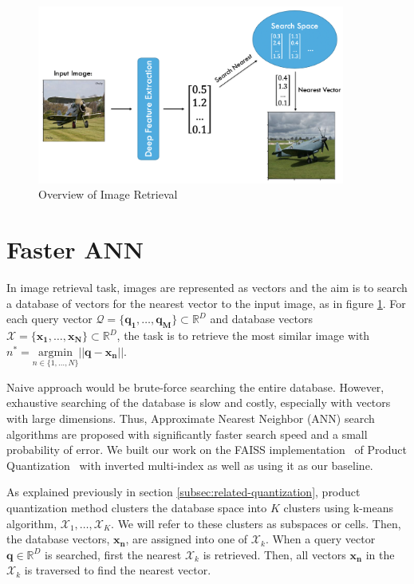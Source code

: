\begin{figure}
    \centering
    \includegraphics[width=0.9\textwidth]{thesis/images/image_ret_exp-fig.png}
    \caption{Overview of Image Retrieval}
    \label{fig:ret-exp}
\end{figure}


\section{Faster ANN}
\label{sec:FasterANN}

In image retrieval task, images are represented as vectors and the aim is to search a database of vectors for the nearest vector to the input image, as in figure \ref{fig:ret-exp}. 
For each query vector $\mathcal{Q} = \{\bm{q_1},\dots,\bm{q_M}\} \subset \mathbb{R}^D$ and database vectors $\mathcal{X} = \{\bm{x_1}, \dots, \bm{x_N}\} \subset \mathbb{R}^D$, the task is to retrieve the most similar image with $n^* = \underset{n\in\{{1,\dots,N}\}}{\mathrm{argmin}} \vert\vert \bm{q} - \bm{x_n} \vert\vert $. 

Naive approach would be brute-force searching the entire database.
However, exhaustive searching of the database is slow and costly, especially with vectors with large dimensions. 
Thus, Approximate Nearest Neighbor (ANN) search algorithms are proposed with significantly faster search speed and a small probability of error. 
We built our work on the FAISS implementation~\cite{faiss} of Product Quantization~\cite{jegou2010product} with inverted multi-index as well as using it as our baseline.

As explained previously in section \ref{subsec:related-quantization}, product quantization method clusters the database space into $K$ clusters using k-means algorithm, $\mathcal{X}_1,\dots,\mathcal{X}_K$. 
We will refer to these clusters as subspaces or cells.
Then, the database vectors, $\bm{x_n}$, are assigned into one of $\mathcal{X}_k$.
When a query vector $\bm{q}\in\mathbb{R}^D$ is searched, first the nearest $\mathcal{X}_k$ is retrieved. 
Then, all vectors $\bm{x_n}$ in the $\mathcal{X}_k$ is traversed to find the nearest vector.

